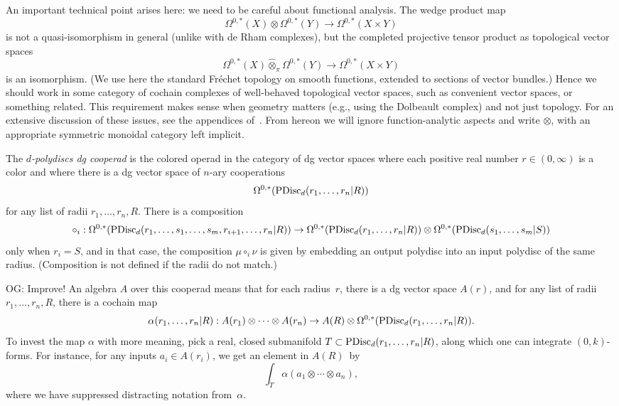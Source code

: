 \documentclass[11pt]{amsart}
\def\owen#1{{\textcolor{violet!65!black}{OG: {#1}}}}
\begin{document}
An important technical point arises here: 
we need to be careful about functional analysis.
The wedge product map
\[
\Omega^{0,*}(X) \otimes \Omega^{0,*}(Y) \to \Omega^{0,*}(X \times Y)
\]
is not a quasi-isomorphism in general (unlike with de Rham complexes),
but the completed projective tensor product as topological vector spaces 
\[
\Omega^{0,*}(X) \widehat{\otimes}_\pi \Omega^{0,*}(Y) \to \Omega^{0,*}(X \times Y)
\]
is an isomorphism.
(We use here the standard Fr\'echet topology on smooth functions, extended to sections of vector bundles.)
Hence we should work in some category of cochain complexes of well-behaved topological vector spaces, such as convenient vector spaces, or something related.
This requirement makes sense when geometry matters (e.g., using the Dolbeault complex) and not just topology.
For an extensive discussion of these issues, see the appendices of~\cite{CG1}.
From hereon we will ignore function-analytic aspects and write $\otimes$,
with an appropriate symmetric monoidal category left implicit.

\begin{dfn}
\label{dfn pdisc}
The {\em $d$-polydiscs dg cooperad} is the colored operad in the category of dg vector spaces where each positive real number $r \in (0,\infty)$ is a color 
and where there is a dg vector space of $n$-ary cooperations
\[
\Omega^{0,*}({\rm PDisc}_d(r_1, \ldots, r_n| R)) 
\]
for any list of radii $r_1,\ldots, r_n, R$.
There is a composition
\[
\circ_i: \Omega^{0,*}({\rm PDisc}_d(r_1, \ldots, s_1, \ldots, s_m, r_{i+1}, \ldots, r_n| R))\to \Omega^{0,*}({\rm PDisc}_d(r_1, \ldots, r_n| R)) \otimes \Omega^{0,*}({\rm PDisc}_d(s_1, \ldots, s_m| S))
\]
only when $r_i = S$, 
and in that case, the composition $\mu \circ_i \nu$ is given by embedding an output polydisc into an input polydisc of the same radius.
(Composition is not defined if the radii do not match.)
\end{dfn}

\owen{Improve!}
An algebra $A$ over this cooperad means that for each radius~$r$, 
there is a dg vector space $A(r)$, and for any list of radii $r_1,\ldots, r_n, R$,
there is a cochain map
\[
\alpha(r_1, \ldots, r_n| R): A(r_1) \otimes \cdots \otimes A(r_n) \to A(R) \otimes \Omega^{0,*}({\rm PDisc}_d(r_1, \ldots, r_n| R)) .
\]
To invest the map $\alpha$ with more meaning, 
pick a real, closed submanifold $T \subset {\rm PDisc}_d(r_1, \ldots, r_n| R)$, along which one can integrate $(0,k)$-forms.
For instance, for any inputs $a_i \in A(r_i)$, we get an element in $A(R)$~by
\[
\int_T \alpha(a_1 \otimes \cdots \otimes a_n),
\]
where we have suppressed distracting notation from~$\alpha$.
\end{document}
